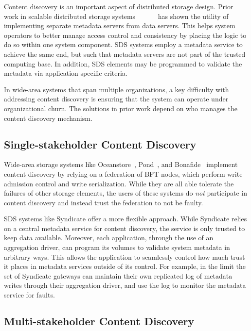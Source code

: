 Content discovery is an important aspect of distributed storage design.
Prior work in scalable distributed storage
systems~\cite{berkeley-xFS}~\cite{farsite}~\cite{zebra}~\cite{spritefs}~\cite{glusterfs}~\cite{lustre}
has shown the utility of implementing separate metadata servers from data
servers.  This helps system operators to better manage access control and
consistency by placing the logic to do so within one system component.
SDS systems employ a metadata service to achieve the same end, but
such that metadata servers are not part of the trusted computing base.
In addition, SDS elements may be programmed to
validate the metadata via application-specific criteria.

In wide-area systems that span multiple organizations, a key difficulty with
addressing content discovery is ensuring that the system can operate under
organizational churn.  The solutions in prior work depend on who manages the content discovery
mechanism.

\subsection{Single-stakeholder Content Discovery}

Wide-area storage systems like Oceanstore~\cite{oceanstore}, Pond~\cite{pond},
and Bonafide~\cite{bonafide} implement content discovery by relying on a
federation of BFT nodes, which perform write admission control and write
serialization.  While they are all able tolerate the failures of other storage
elements, the users of these systems do \emph{not} participate in content
discovery and instead trust the federation to not be faulty.

SDS systems like Syndicate offer a more flexible approach.  While Syndicate
relies on a central metadata service for content discovery, the service is only
trusted to keep data available.  Moreover, each application, through the use of an aggregation driver, can
program its volumes to validate system metadata in arbitrary ways.  This allows
the application to seamlessly control how much trust it places in metadata
services outside of its control.  For example, in the limit
the set of Syndicate gateways can maintain their own replicated log of metadata
writes through their aggregation driver,
and use the log to monitor the metadata service for faults.

\subsection{Multi-stakeholder Content Discovery}

